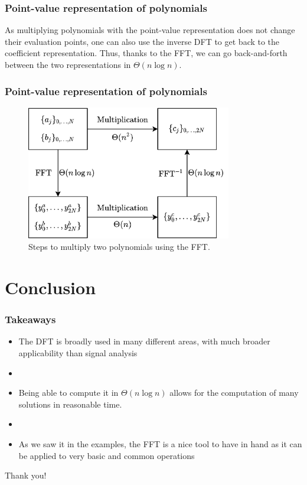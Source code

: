 \documentclass{beamer}
\begin{document}
\begin{frame}
    \frametitle{Point-value representation of polynomials}
    As multiplying polynomials with the point-value representation does not change their evaluation points, one can also use the inverse DFT to get back to the coefficient representation.
    \linebreak \linebreak
    Thus, thanks to the FFT, we can go back-and-forth between the two representations in $\Theta\left( n \log n \right) $.
\end{frame}

\begin{frame}
    \frametitle{Point-value representation of polynomials}
    \begin{figure}
        \centering
        \includegraphics[width=0.8\textwidth]{poly_mult.png}
        \caption{Steps to multiply two polynomials using the FFT.}
        \label{fig:poly_mult-png}
    \end{figure}
\end{frame}

\section{Conclusion}
\begin{frame}
    \frametitle{Takeaways}

    \begin{itemize}
        \item The DFT is broadly used in many different areas, with much broader applicability than signal analysis
	\item
	\item Being able to compute it in $\Theta\left( n \log n \right) $ allows for the computation of many solutions in reasonable time.
	\item
	\item As we saw it in the examples, the FFT is a nice tool to have in hand as it can be applied to very basic and common operations
    \end{itemize}
\end{frame}

\begin{frame}
    \begin{center}
	Thank you!
    \end{center}
\end{frame}
\end{document}
